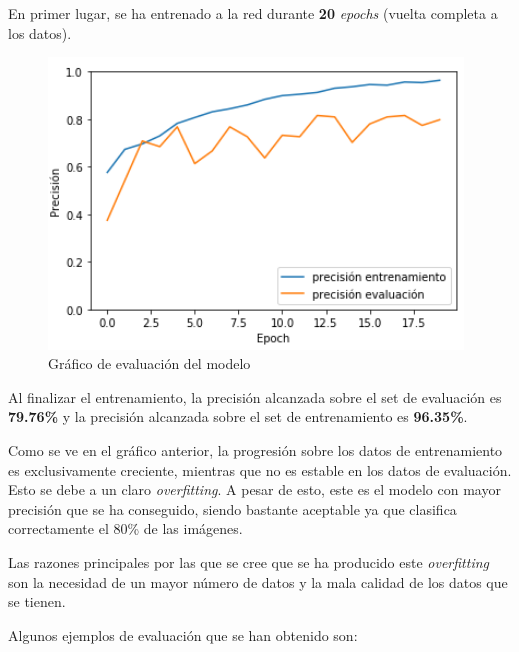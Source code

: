 \documentclass{uc3mpracticas}
\begin{document}
  En primer lugar, se ha entrenado a la red durante \textbf{20} \textit{epochs} (vuelta completa a los datos).

  \begin{figure}[H]
    \centering
    \includegraphics[width=110mm]{Images/evaluacion.png}
    \caption{Gráfico de evaluación del modelo}
  \end{figure}


  Al finalizar el entrenamiento, la precisión alcanzada sobre el set de evaluación es \textbf{79.76\%} y la precisión alcanzada sobre el set de entrenamiento es \textbf{96.35\%}.

  \vspace{2mm}

  Como se ve en el gráfico anterior, la progresión sobre los datos de entrenamiento es exclusivamente creciente, mientras que no es estable en los datos de evaluación. Esto se debe a un claro \textit{overfitting}. A pesar de esto, este es el modelo con mayor precisión que se ha conseguido, siendo bastante aceptable ya que clasifica correctamente el 80\% de las imágenes.

  \vspace{2mm}

  Las razones principales por las que se cree que se ha producido este \textit{overfitting} son la necesidad de un mayor número de datos y la mala calidad de los datos que se tienen.

  \vspace{3mm}

  Algunos ejemplos de evaluación que se han obtenido son:
\end{document}
